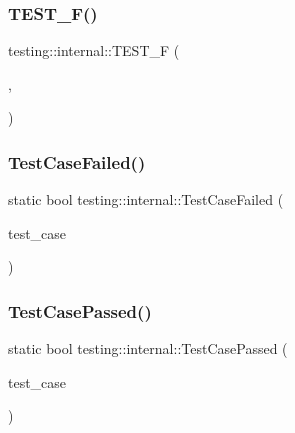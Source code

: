 \mbox{\label{namespacetesting_1_1internal_a02cef32090020d164460dd3d9f8e2852}} 
\subsubsection{\texorpdfstring{TEST\_F()}{TEST\_F()}\hspace{0.1cm}{\footnotesize\ttfamily [2/2]}}
{\footnotesize\ttfamily testing\+::internal\+::\+T\+E\+S\+T\+\_\+F (\begin{DoxyParamCaption}\item[{\mbox{\hyperlink{classtesting_1_1internal_1_1ListenerTest}{Listener\+Test}}}]{,  }\item[{Does\+Bar}]{ }\end{DoxyParamCaption})}

\mbox{\label{namespacetesting_1_1internal_a53454b6089c1c5b25319caa9de6c5c02}} 
\subsubsection{\texorpdfstring{TestCaseFailed()}{TestCaseFailed()}}
{\footnotesize\ttfamily static bool testing\+::internal\+::\+Test\+Case\+Failed (\begin{DoxyParamCaption}\item[{const \mbox{\hyperlink{classtesting_1_1TestCase}{Test\+Case}} $\ast$}]{test\+\_\+case }\end{DoxyParamCaption})\hspace{0.3cm}{\ttfamily [static]}}

\mbox{\label{namespacetesting_1_1internal_aadc7afca7aab40f7f1d41bc17974459a}} 
\subsubsection{\texorpdfstring{TestCasePassed()}{TestCasePassed()}}
{\footnotesize\ttfamily static bool testing\+::internal\+::\+Test\+Case\+Passed (\begin{DoxyParamCaption}\item[{const \mbox{\hyperlink{classtesting_1_1TestCase}{Test\+Case}} $\ast$}]{test\+\_\+case }\end{DoxyParamCaption})\hspace{0.3cm}{\ttfamily [static]}}

